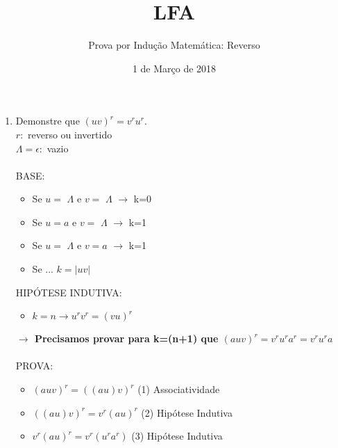 \documentclass[a4paper,12pt]{article}
\title{LFA}
\author{Prova por Indução Matemática: Reverso }
\date{1 de Março de 2018}
\begin{document}
\maketitle

\begin{enumerate}
	\item Demonstre que $(uv)^r=v^ru^r$.\\
	$r:$ reverso ou invertido\\
	$\Lambda=\epsilon:$ vazio\\\\
	
	
	BASE:
	\begin{itemize}
		
	
		\item Se $u=$ $\Lambda$ e $v=$ $\Lambda$ $\rightarrow$ k=0
		\item Se $u=a$ e $v=$ $\Lambda$ $\rightarrow$ k=1
		\item Se $u=$ $\Lambda$ e $v=a$ $\rightarrow$ k=1
		\item Se ...  \space\space\space\space\space\space\space\space\space\space\space $k=|uv|$\\ 
		
	
		
			
	\end{itemize}
	
	HIPÓTESE INDUTIVA:
	\begin{itemize}
		\item 	$k=n \rightarrow u^rv^r = (vu)^r$\\
		

		\end{itemize}
			\textbf{$\rightarrow$ Precisamos provar para k=(n+1) que $(auv)^r=v^ru^ra^r=v^ru^ra$}  \\\\
	
	PROVA:
	\begin{itemize}

		
		 \item$(auv)^r=((au)v)^r$
		 \space\space\space\space\space\space\space\space\space\space\space\space\space\space\space	 
		 (1) Associatividade
		 
		 \item$((au)v)^r=v^r(au)^r$
		 \space\space\space\space\space\space\space\space\space\space\space\space\space\space 
		 (2) Hipótese Indutiva
		 
		 \item$v^r(au)^r=v^r(u^ra^r)$
		 \space\space\space\space\space\space\space\space\space\space\space\space\space\space 
		 (3) Hipótese Indutiva
		 

\end{itemize}
\end{enumerate}
\end{document}

